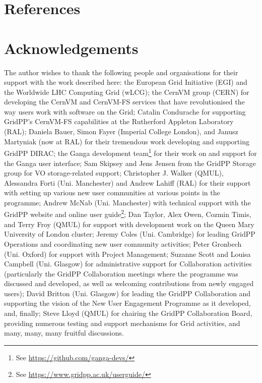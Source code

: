 \documentclass[12pt,a4paper]{iopart}
\begin{document}
\clearpage



%
%
\section*{References}


%

\newpage

\section*{Acknowledgements}
\label{sec:ack}
The author wishes to thank the following people and organisations for
their support with the work described here:
%
the European Grid Initiative (EGI)
and
the Worldwide LHC Computing Grid (wLCG);
the CernVM group (CERN) for developing the CernVM
and CernVM-FS services that have revolutionised the way
users work with software on the Grid;
%
Catalin Condurache for supporting GridPP's CernVM-FS
capabilities at the Rutherford Appleton Laboratory (RAL);
%
Daniela Bauer, Simon Fayer (Imperial College London),
and Janusz Martyniak (now at RAL)
for their tremendous work developing and supporting GridPP DIRAC;
%
the Ganga development team\footnote{%
See \href{https://github.com/ganga-devs/}{https://github.com/ganga-devs/}}
for their work on and support for the Ganga user interface;
Sam Skipsey and Jens Jensen from the
GridPP Storage group for VO storage-related support;
%
Christopher J. Walker (QMUL), Alessandra Forti (Uni. Manchester)
and Andrew Lahiff (RAL) for their support
with setting up various new user communities at various points in the programme;
Andrew McNab (Uni. Manchester) with technical support with
the GridPP website and online user guide\footnote{%
See \href{https://www.gridpp.ac.uk/userguide/}{https://www.gridpp.ac.uk/userguide/}};
%
Dan Taylor, Alex Owen, Cozmin Timis, and Terry Froy (QMUL) for
support with development work on the Queen Mary University of London cluster;
%
Jeremy Coles (Uni. Cambridge) for leading GridPP Operations and
coordinating new user community activities;
%
Peter Gronbech (Uni. Oxford) for support with Project Management;
%
Suzanne Scott and Louisa Campbell (Uni. Glasgow) for administrative
support for Collaboration activities (particularly
the GridPP Collaboration meetings where the programme was
discussed and developed, as well as welcoming contributions from
newly engaged users);
%
David Britton (Uni. Glasgow) for leading the GridPP Collaboration
and supporting the vision of the New User Engagement Programme
as it developed, and, finally;
%
Steve Lloyd (QMUL) for chairing the GridPP Collaboration Board,
providing numerous testing and support mechanisms for Grid
activities, and many, many, many fruitful discussions.
\end{document}
